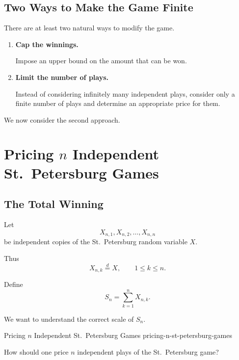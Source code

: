 
\subsection{Two Ways to Make the Game Finite}

There are at least two natural ways to modify the game.

\begin{enumerate}

    \item \textbf{Cap the winnings.}

    Impose an upper bound on the amount that can be won.

    \item \textbf{Limit the number of plays.}

    Instead of considering infinitely many independent plays, consider
    only a finite number of plays and determine an appropriate price
    for them.

\end{enumerate}

We now consider the second approach.



\section{Pricing \(n\) Independent St.\ Petersburg Games}

\subsection{The Total Winning}

Let
\[
X_{n,1},X_{n,2},\ldots,X_{n,n}
\]
be independent copies of the St.\ Petersburg random variable $X$.

Thus
\[
X_{n,k}\overset{d}{=}X,
\qquad
1\leq k\leq n.
\]

Define
\[
S_n
=
\sum_{k=1}^nX_{n,k}.
\]

We want to understand the correct scale of $S_n$.

\begin{question}{Pricing \(n\) Independent St.\ Petersburg Games}
{pricing-n-st-petersburg-games}

How should one price $n$ independent plays of the St.\ Petersburg game?

\end{question}


